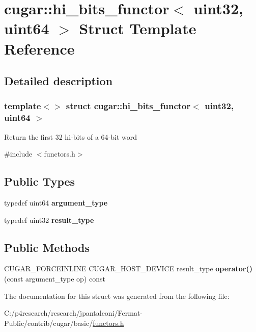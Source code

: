 \hypertarget{structcugar_1_1hi__bits__functor_3_01uint32_00_01uint64_01_4}{}\section{cugar\+:\+:hi\+\_\+bits\+\_\+functor$<$ uint32, uint64 $>$ Struct Template Reference}
\label{structcugar_1_1hi__bits__functor_3_01uint32_00_01uint64_01_4}


\subsection{Detailed description}
\subsubsection*{template$<$$>$\newline
struct cugar\+::hi\+\_\+bits\+\_\+functor$<$ uint32, uint64 $>$}

Return the first 32 hi-\/bits of a 64-\/bit word 

{\ttfamily \#include $<$functors.\+h$>$}

\subsection*{Public Types}
\begin{DoxyCompactItemize}
\item 
\mbox{\label{structcugar_1_1hi__bits__functor_3_01uint32_00_01uint64_01_4_a769452c89ab1c96cfc1aefb44cc1090e}} 
typedef uint64 {\bfseries argument\+\_\+type}
\item 
\mbox{\label{structcugar_1_1hi__bits__functor_3_01uint32_00_01uint64_01_4_a7807506013acdd5a919144363e3b2c1c}} 
typedef uint32 {\bfseries result\+\_\+type}
\end{DoxyCompactItemize}
\subsection*{Public Methods}
\begin{DoxyCompactItemize}
\item 
\mbox{\label{structcugar_1_1hi__bits__functor_3_01uint32_00_01uint64_01_4_a234d619fc43f9daf2009fdf7f3cbc987}} 
C\+U\+G\+A\+R\+\_\+\+F\+O\+R\+C\+E\+I\+N\+L\+I\+NE C\+U\+G\+A\+R\+\_\+\+H\+O\+S\+T\+\_\+\+D\+E\+V\+I\+CE result\+\_\+type {\bfseries operator()} (const argument\+\_\+type op) const
\end{DoxyCompactItemize}


The documentation for this struct was generated from the following file\+:\begin{DoxyCompactItemize}
\item 
C\+:/p4research/research/jpantaleoni/\+Fermat-\/\+Public/contrib/cugar/basic/\hyperlink{functors_8h}{functors.\+h}\end{DoxyCompactItemize}
